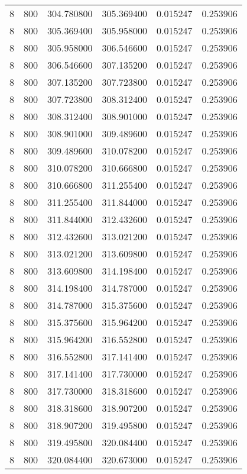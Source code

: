 \begin{longtable}{rrrrrr}
8 & 800 & 304.780800 & 305.369400 & 0.015247 & 0.253906 \\
8 & 800 & 305.369400 & 305.958000 & 0.015247 & 0.253906 \\
8 & 800 & 305.958000 & 306.546600 & 0.015247 & 0.253906 \\
8 & 800 & 306.546600 & 307.135200 & 0.015247 & 0.253906 \\
8 & 800 & 307.135200 & 307.723800 & 0.015247 & 0.253906 \\
8 & 800 & 307.723800 & 308.312400 & 0.015247 & 0.253906 \\
8 & 800 & 308.312400 & 308.901000 & 0.015247 & 0.253906 \\
8 & 800 & 308.901000 & 309.489600 & 0.015247 & 0.253906 \\
8 & 800 & 309.489600 & 310.078200 & 0.015247 & 0.253906 \\
8 & 800 & 310.078200 & 310.666800 & 0.015247 & 0.253906 \\
8 & 800 & 310.666800 & 311.255400 & 0.015247 & 0.253906 \\
8 & 800 & 311.255400 & 311.844000 & 0.015247 & 0.253906 \\
8 & 800 & 311.844000 & 312.432600 & 0.015247 & 0.253906 \\
8 & 800 & 312.432600 & 313.021200 & 0.015247 & 0.253906 \\
8 & 800 & 313.021200 & 313.609800 & 0.015247 & 0.253906 \\
8 & 800 & 313.609800 & 314.198400 & 0.015247 & 0.253906 \\
8 & 800 & 314.198400 & 314.787000 & 0.015247 & 0.253906 \\
8 & 800 & 314.787000 & 315.375600 & 0.015247 & 0.253906 \\
8 & 800 & 315.375600 & 315.964200 & 0.015247 & 0.253906 \\
8 & 800 & 315.964200 & 316.552800 & 0.015247 & 0.253906 \\
8 & 800 & 316.552800 & 317.141400 & 0.015247 & 0.253906 \\
8 & 800 & 317.141400 & 317.730000 & 0.015247 & 0.253906 \\
8 & 800 & 317.730000 & 318.318600 & 0.015247 & 0.253906 \\
8 & 800 & 318.318600 & 318.907200 & 0.015247 & 0.253906 \\
8 & 800 & 318.907200 & 319.495800 & 0.015247 & 0.253906 \\
8 & 800 & 319.495800 & 320.084400 & 0.015247 & 0.253906 \\
8 & 800 & 320.084400 & 320.673000 & 0.015247 & 0.253906 \\

\end{longtable}

